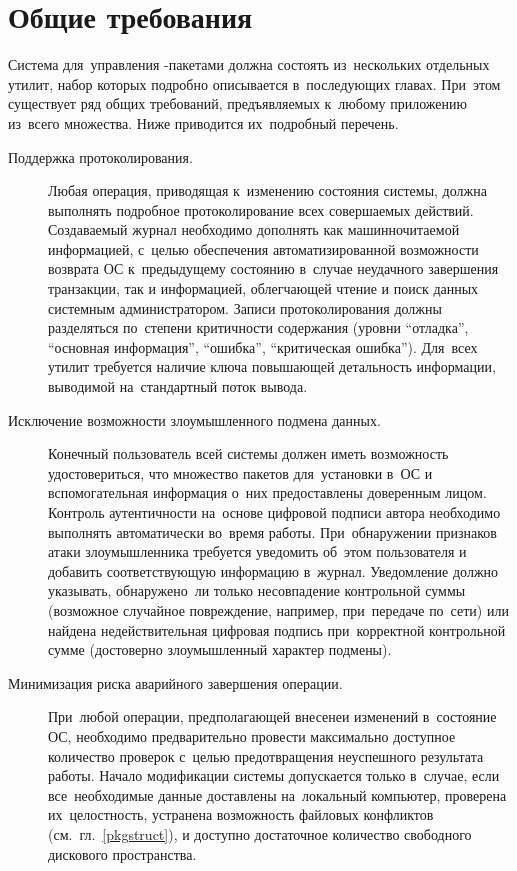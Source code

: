 
\section{Общие требования}

Система для~управления -пакетами должна состоять из~нескольких отдельных утилит,
набор которых подробно описывается в~последующих главах.
При~этом существует ряд общих требований, предъявляемых к~любому приложению из~всего множества.
Ниже приводится их~подробный перечень.

\begin{description}

\item[Поддержка протоколирования.]
Любая операция, приводящая к~изменению состояния системы, 
должна выполнять подробное протоколирование всех совершаемых  действий.
Создаваемый журнал необходимо дополнять как машинночитаемой информацией,
с~целью обеспечения автоматизированной возможности возврата ОС к~предыдущему состоянию в~случае неудачного завершения транзакции, 
так и информацией, облегчающей чтение и поиск данных системным администратором.
Записи протоколирования должны разделяться по~степени критичности содержания 
(уровни ``отладка'', ``основная информация'', ``ошибка'', ``критическая ошибка'').
Для~всех утилит требуется наличие ключа  повышающей детальность информации,
выводимой на~стандартный поток вывода.

\item[Исключение возможности злоумышленного подмена данных.]
Конечный пользователь всей системы должен иметь возможность удостовериться, что множество пакетов для~установки в~ОС и 
вспомогательная информация о~них предоставлены доверенным лицом.
Контроль аутентичности на~основе цифровой подписи автора необходимо выполнять автоматически  во~время работы.
При~обнаружении признаков атаки злоумышленника требуется уведомить об~этом пользователя и добавить соответствующую информацию в~журнал.
Уведомление должно указывать, обнаружено~ли только несовпадение контрольной суммы (возможное случайное повреждение, например, при~передаче по~сети)
или найдена недействительная цифровая подпись при~корректной контрольной сумме (достоверно злоумышленный характер подмены).

\item[Минимизация риска аварийного завершения операции.]
При~любой операции, предполагающей внесенеи изменений в~состояние ОС, необходимо предварительно 
провести максимально доступное количество проверок с~целью предотвращения неуспешного результата работы.
Начало модификации системы допускается только в~случае, если все~необходимые данные доставлены на~локальный компьютер,
проверена их~целостность, устранена возможность файловых конфликтов (см.~гл.~\ref{pkgstruct}), и доступно достаточное количество свободного дискового пространства.


\end{description}

